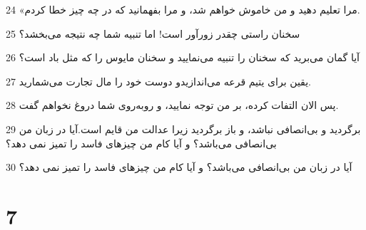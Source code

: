 \par 24 «مرا تعلیم دهید و من خاموش خواهم شد، و مرا بفهمانید که در چه چیز خطا کردم.
\par 25 سخنان راستی چقدر زورآور است! اما تنبیه شما چه نتیجه می‌بخشد؟
\par 26 آیا گمان می‌برید که سخنان را تنبیه می‌نمایید و سخنان مایوس را که مثل باد است؟
\par 27 یقین برای یتیم قرعه می‌اندازیدو دوست خود را مال تجارت می‌شمارید.
\par 28 پس الان التفات کرده، بر من توجه نمایید، و روبه‌روی شما دروغ نخواهم گفت.
\par 29 برگردید و بی‌انصافی نباشد، و باز برگردید زیرا عدالت من قایم است.آیا در زبان من بی‌انصافی می‌باشد؟ و آیا کام من چیزهای فاسد را تمیز نمی دهد؟
\par 30 آیا در زبان من بی‌انصافی می‌باشد؟ و آیا کام من چیزهای فاسد را تمیز نمی دهد؟
 
\chapter{7}

